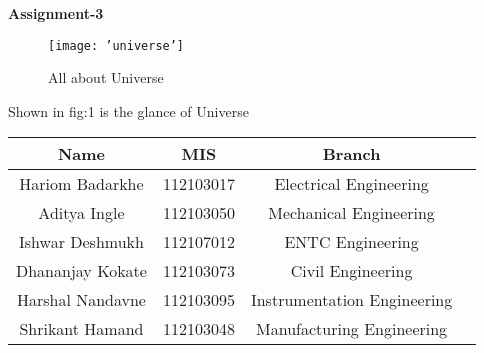 \documentclass[12 pt]{article}
\begin{document}
\begin{center}

 \bf {Assignment-3}

\begin{figure}[h]
\centering
\texttt{[image: 'universe']}
\caption{All about Universe}
\label{fig:Universe}
\end{figure}
Shown in fig:1 is the glance of Universe
\end{center}






\begin{center}
\begin{tabular}{ |c|c|c|c| } 
\hline
Name & MIS & Branch \\
\hline
 Hariom Badarkhe  & 112103017 & Electrical Engineering \\ 
\hline
Aditya Ingle & 112103050 & Mechanical Engineering \\ 
\hline
Ishwar Deshmukh & 112107012 & ENTC Engineering \\ 
\hline
Dhananjay Kokate & 112103073 & Civil Engineering \\
\hline
Harshal Nandavne & 112103095 & Instrumentation Engineering \\

\hline
Shrikant Hamand & 112103048 & Manufacturing Engineering \\
\hline
\end{tabular}
\end{center}
\end{document}
